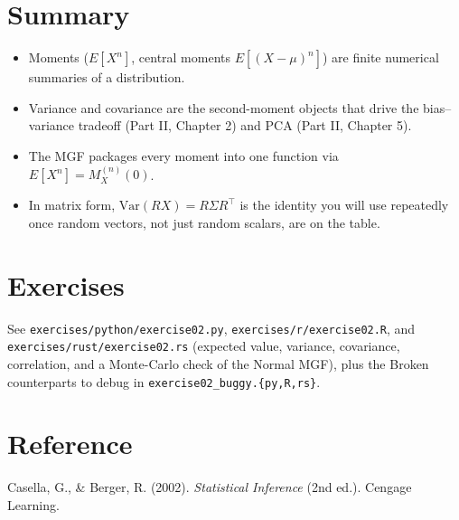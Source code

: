 \documentclass[11pt]{article}
\begin{document}
\section{Summary}
\begin{summarybox}
\begin{itemize}[nosep]
  \item Moments ($E[X^n]$, central moments $E[(X-\mu)^n]$) are finite
        numerical summaries of a distribution.
  \item Variance and covariance are the second-moment objects that drive
        the bias--variance tradeoff (Part II, Chapter 2) and PCA (Part II,
        Chapter 5).
  \item The MGF packages every moment into one function via
        $E[X^n] = M_X^{(n)}(0)$.
  \item In matrix form, $\mathrm{Var}(RX) = R\Sigma R^\top$ is the identity
        you will use repeatedly once random vectors, not just random
        scalars, are on the table.
\end{itemize}
\end{summarybox}

\section{Exercises}
See \texttt{exercises/python/exercise02.py}, \texttt{exercises/r/exercise02.R},
and \texttt{exercises/rust/exercise02.rs} (expected value, variance,
covariance, correlation, and a Monte-Carlo check of the Normal MGF), plus the
Broken counterparts to debug in \texttt{exercise02\_buggy.\{py,R,rs\}}.

\section*{Reference}
Casella, G., \& Berger, R. (2002). \emph{Statistical Inference} (2nd ed.).
Cengage Learning.
\end{document}
